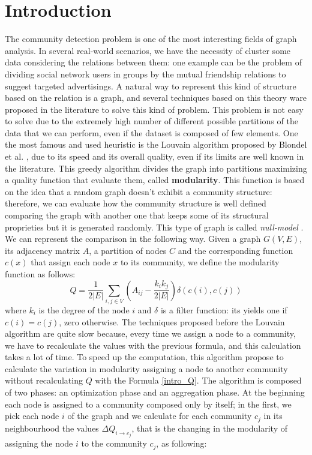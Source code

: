 \section{Introduction}
The community detection problem is one of the most interesting fields of graph analysis. In several real-world scenarios, we have the necessity of cluster some data considering the relations between them: one example can be the problem of dividing social network users in groups by the mutual friendship relations to suggest targeted advertisings. A natural way to represent this kind of structure based on the relation is a graph, and several techniques based on this theory ware proposed in the literature to solve this kind of problem. This problem is not easy to solve due to the extremely high number of different possible partitions of the data that we can perform, even if the dataset is composed of few elements.
One the most famous and used heuristic is the Louvain algorithm proposed by Blondel et al. \cite{Blondel_2008}, due to its speed and its overall quality, even if its limits are well known in the literature. This greedy algorithm divides the graph into partitions maximizing a quality function that evaluate them, called \textbf{modularity}. This function is based on the idea that a random graph doesn't exhibit a community structure: therefore, we can evaluate how the community structure is well defined comparing the graph with another one that keeps some of its structural proprieties but it is generated randomly. This type of graph is called \textit{null-model} \cite{Girvan2002Community}. We can represent the comparison in the following way. Given a graph $G(V,E)$, its adjacency matrix $A$, a partition of nodes $C$ and the corresponding function $c(x)$ that assign each node $x$ to its community, we define the modularity function as follows:
\begin{equation}\label{intro_Q}
Q = \frac{1}{2|E|} \sum_{i,j \in V}\left(A_{ij} - \frac{k_ik_j}{2|E|}\right) \delta(c(i), c(j))
\end{equation}
where $k_i$ is the degree of the node $i$ and $\delta$ is a filter function: its yields one if $c(i) = c(j)$, zero otherwise.
The techniques proposed before the Louvain algorithm are quite slow because, every time we assign a node to a community, we have to recalculate the values with the previous formula, and this calculation takes a lot of time. To speed up the computation, this algorithm propose to calculate the variation in modularity assigning a node to another community without recalculating $Q$ with the Formula \ref{intro_Q}. The algorithm is composed of two phases: an optimization phase and an aggregation phase. At the beginning each node is assigned to a community composed only by itself; in the first, we pick each node $i$ of the graph and we calculate for each community $c_j$ in its neighbourhood the values $\Delta Q_{i \rightarrow c_j}$, that is the changing in the modularity of assigning the node $i$ to the community $c_j$, as following:
